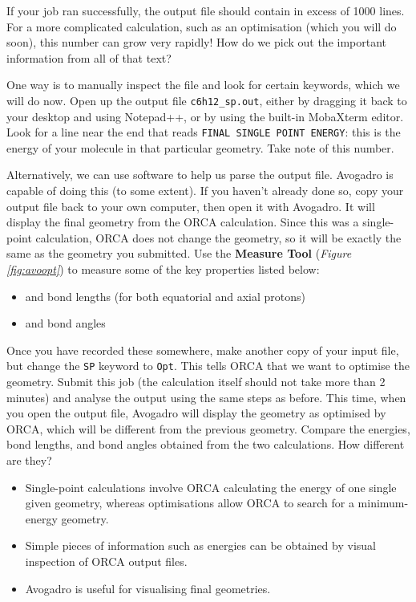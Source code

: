 \documentclass[10pt]{article}
\newcommand{\figref}[1]{\textit{Figure \ref{fig:#1}}}
\begin{document}
If your job ran successfully, the output file should contain in excess of 1000 lines. For a more complicated calculation, such as an optimisation (which you will do soon), this number can grow very rapidly! How do we pick out the important information from all of that text?

One way is to manually inspect the file and look for certain keywords, which we will do now. Open up the output file \texttt{c6h12\_sp.out}, either by dragging it back to your desktop and using Notepad++, or by using the built-in MobaXterm editor. Look for a line near the end that reads \texttt{FINAL SINGLE POINT ENERGY}: this is the energy of your molecule in that particular geometry. Take note of this number.

Alternatively, we can use software to help us parse the output file. Avogadro is capable of doing this (to some extent). If you haven't already done so, copy your output file back to your own computer, then open it with Avogadro. It will display the final geometry from the ORCA calculation. Since this was a single-point calculation, ORCA does not change the geometry, so it will be exactly the same as the geometry you submitted. Use the \textbf{Measure Tool} (\figref{avoopt}) to measure some of the key properties listed below:

\begin{itemize}
    \item {} and  bond lengths (for both equatorial and axial protons)
    \item {} and  bond angles
\end{itemize}

Once you have recorded these somewhere, make another copy of your input file, but change the \texttt{SP} keyword to \texttt{Opt}. This tells ORCA that we want to optimise the geometry. Submit this job (the calculation itself should not take more than 2 minutes) and analyse the output using the same steps as before. This time, when you open the output file, Avogadro will display the geometry as optimised by ORCA, which will be different from the previous geometry. Compare the energies, bond lengths, and bond angles obtained from the two calculations. How different are they?

\begin{summary}
    \begin{itemize}[leftmargin=0.6cm]
        \item Single-point calculations involve ORCA calculating the energy of one single given geometry, whereas optimisations allow ORCA to search for a minimum-energy geometry.
        \item Simple pieces of information such as energies can be obtained by visual inspection of ORCA output files.
        \item Avogadro is useful for visualising final geometries.
    \end{itemize}
\end{summary}
\end{document}
